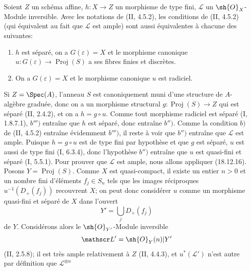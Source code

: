 \begin{corollary}[18.12.17]
\label{IV.18.12.17}
Soient $Z$ un schéma affine, $h:X\to Z$ un morphisme de type fini, $\mathscr L$ un $\sh{O}_X$-Module inversible. Avec les notations de (II, 4.5.2), les conditions de (II, 4.5.2) (qui équivalent au fait que $\mathscr L$ est ample) sont aussi équivalentes à chacune des suivantes:
\begin{enumerate}
  \item[$b'')$] $h$ est séparé, on a $G(\varepsilon)=X$ et le morphisme canonique $u:G(\varepsilon)\to\operatorname{Proj}(S)$ a ses fibres finies et discrètes.
  \item[$b''')$] On a $G(\varepsilon)=X$ et le morphisme canonique $u$ est radiciel.
\end{enumerate}
\end{corollary}

Si $Z=\Spec(A)$, l'anneau $S$ est canoniquement muni d'une structure de $A$-algèbre graduée, donc on a un morphisme structural $g:\operatorname{Proj}(S)\to Z$ qui est séparé (II, 2.4.2), et on a $h=g\circ u$. Comme tout morphisme radiciel est séparé (I, 1.8.7.1), $b''')$ entraîne que $h$ est séparé, donc entraîne $b'')$. Comme la condition $b)$ de (II, 4.5.2) entraîne évidemment $b''')$, il reste à voir que $b'')$ entraîne que $\mathscr L$ est ample. Puisque $h=g\circ u$ est de type fini par hypothèse et que $g$ est séparé, $u$ est aussi de type fini (I, 6.3.4), donc l'hypothèse $b'')$ entraîne que $u$ est quasi-fini et séparé (I, 5.5.1). Pour prouver que $\mathscr L$ est ample, nous allons appliquer (18.12.16). Posons $Y=\operatorname{Proj}(S)$. Comme $X$ est quasi-compact, il existe un entier $n>0$ et un nombre fini d'éléments $f_j\in S_n$ tels que les images réciproques $u^{-1}(D_+(f_j))$ recouvrent $X$; on peut donc considérer $u$ comme un morphisme quasi-fini et séparé de $X$ dans l'ouvert
\[
  Y'=\bigcup_j D_+(f_j)
\]
de $Y$. Considérons alors le $\sh{O}_{Y'}$-Module inversible
\[
  \mathscr L'=\sh{O}_Y(n)|Y'
\]
(II, 2.5.8); il est très ample relativement à $Z$ (II, 4.4.3), et $u^*(\mathscr L')$ n'est autre par définition que $\mathscr L^{\otimes n}$

